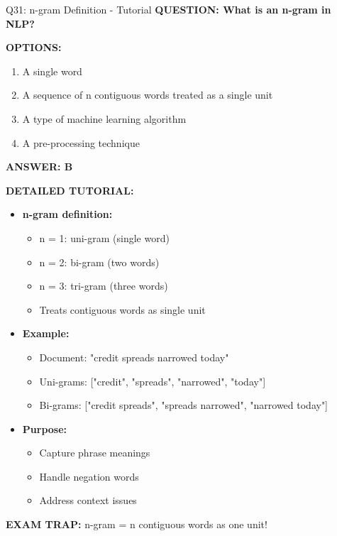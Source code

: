 \documentclass[8pt]{beamer}
\begin{document}
	\begin{frame}{Q31: n-gram Definition - Tutorial}
		\fontsize{6.5}{7.5}\selectfont
		\textbf{QUESTION: What is an n-gram in NLP?}
		
		\vspace{0.1cm}
		\textbf{OPTIONS:}
		\begin{enumerate}
			\item A single word
			\item A sequence of n contiguous words treated as a single unit
			\item A type of machine learning algorithm
			\item A pre-processing technique
		\end{enumerate}
		
		\vspace{0.1cm}
		\textcolor{myblue}{\textbf{ANSWER: B}}
		
		\vspace{0.1cm}
		\textbf{DETAILED TUTORIAL:}
		\begin{itemize}
			\item \textbf{n-gram definition:}
			\begin{itemize}
				\item n = 1: uni-gram (single word)
				\item n = 2: bi-gram (two words)
				\item n = 3: tri-gram (three words)
				\item Treats contiguous words as single unit
			\end{itemize}
			\item \textbf{Example:}
			\begin{itemize}
				\item Document: "credit spreads narrowed today"
				\item Uni-grams: ["credit", "spreads", "narrowed", "today"]
				\item Bi-grams: ["credit spreads", "spreads narrowed", "narrowed today"]
			\end{itemize}
			\item \textbf{Purpose:}
			\begin{itemize}
				\item Capture phrase meanings
				\item Handle negation words
				\item Address context issues
			\end{itemize}
		\end{itemize}
		
		\textcolor{myred}{\textbf{EXAM TRAP:}} n-gram = \textcolor{myblue}{n contiguous words as one unit}!
	\end{frame}
	
\end{document}
